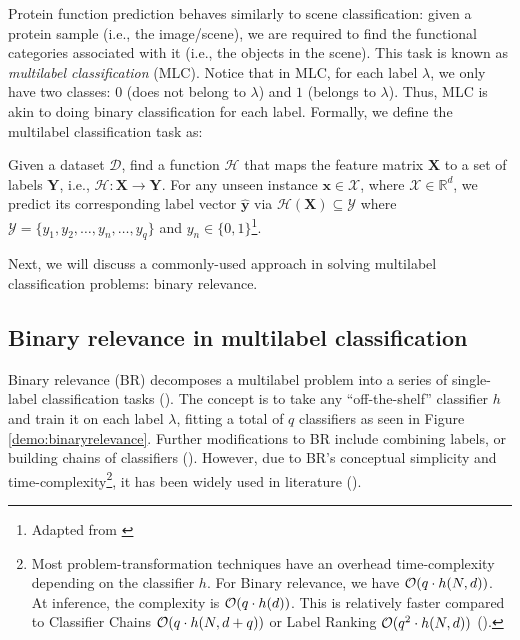 \newpage
\par Protein function prediction behaves similarly to scene classification:
given a protein sample (i.e., the image/scene), we are required to find the
functional categories associated with it (i.e., the objects in the scene).
This task is known as \textit{multilabel classification} (MLC). Notice that
in MLC, for each label $\lambda$, we only have two classes: $0$ (does not
belong to $\lambda$) and $1$ (belongs to $\lambda$). Thus, MLC is akin to
doing binary classification for each label. Formally, we define the multilabel
classification task as:

\begin{definition}{}
Given a dataset $\mathcal{D}$, find a function $\mathcal{H}$ that maps the
feature matrix $\mathbf{X}$ to a set of labels $\mathbf{Y}$, i.e.,
$\mathcal{H}: \mathbf{X} \rightarrow \mathbf{Y}$. For any unseen instance
$\mathbf{x} \in \mathcal{X}$, where $\mathcal{X} \in \mathbb{R}^d$, we
predict its corresponding label vector $\mathbf{\widehat{y}}$ via
$\mathcal{H}(\mathbf{X}) \subseteq \mathcal{Y}$ where $\mathcal{Y} = \{y_1,
y_2, \dots, y_n, \dots, y_q\}$ and $y_n \in \{0,1\}$\footnote{Adapted from
\cite{zhang2014review}}.
\end{definition}

\par Next, we will discuss a commonly-used approach in solving multilabel
classification problems: binary relevance.

\subsection{Binary relevance in multilabel classification}

\par Binary relevance (BR) decomposes a multilabel problem into a series of
single-label classification tasks (\cite{boutell2004learning,
tsoumakas2007multilabel}). The concept is to take any ``off-the-shelf''
classifier $h$ and train it on each label $\lambda$, fitting a total of $q$
classifiers as seen in Figure \ref{demo:binaryrelevance}. Further
modifications to BR include combining labels, or building chains of
classifiers (\cite{read2009classifier}). However, due to BR's conceptual
simplicity and time-complexity\footnote[2]{
    Most problem-transformation techniques have an overhead time-complexity
    depending on the classifier $h$. For Binary relevance, we have $\mathcal{O}(q
    \cdot h(N, d))$. At inference, the complexity is $\mathcal{O}(q
    \cdot h(d))$. This is relatively faster compared to Classifier Chains
    $\mathcal{O}(q \cdot h(N, d + q))$ or Label Ranking $\mathcal{O}(q^{2} \cdot h(N, d))$
    (\cite{zhang2014review}).
}, it has been widely used in literature (\cite{zhang2017binary}).

